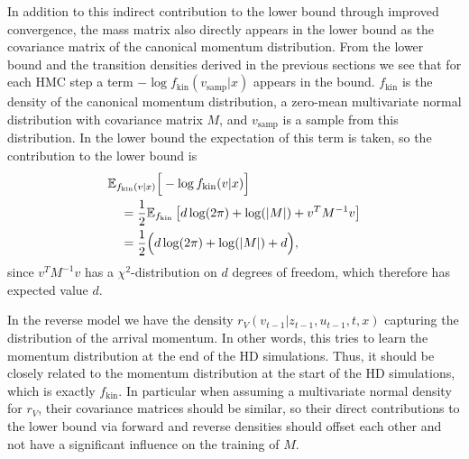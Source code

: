 In addition to this indirect contribution to the lower bound through improved convergence, the mass matrix also directly appears in the lower bound as the covariance matrix of the canonical momentum distribution. From the lower bound and the transition densities derived in the previous sections we see that for each HMC step a term $-\log f_\textrm{kin}(v_\textrm{samp}|x)$ appears in the bound. $f_\textrm{kin}$ is the density of the canonical momentum distribution, a zero-mean multivariate normal distribution with covariance matrix $M$, and $v_\textrm{samp}$ is a sample from this distribution. In the lower bound the expectation of this term is taken, so the contribution to the lower bound is
\begin{equation}
\begin{split}
&\mathbb{E}_{f_\textrm{kin}(v|x)} \Big[ -\log f_\textrm{kin}(v|x) \Big] \\
&\quad= \frac{1}{2}\mathbb{E}_{f_\textrm{kin}} \left[d\log(2 \pi) + \log(|M|) +  v^T M^{-1} v \right] \\
&\quad= \frac{1}{2} \Big( d \log(2 \pi) + \log(|M|) + d \Big), 
\end{split}
\end{equation}
since $v^T M^{-1} v$ has a $\chi^2$-distribution on $d$ degrees of freedom, which therefore has expected value $d$. 

%
In the reverse model we have the density $r_V(v_{t-1}|z_{t-1}, u_{t-1}, t, x)$ capturing the distribution of the arrival momentum. In other words, this tries to learn the momentum distribution at the end of the HD simulations. Thus, it should be closely related to the momentum distribution at the start of the HD simulations, which is exactly $f_\textrm{kin}$. In particular when assuming a multivariate normal density for $r_V$, their covariance matrices should be similar, so their direct contributions to the lower bound via forward and reverse densities should offset each other and not have a significant influence on the training of $M$.

